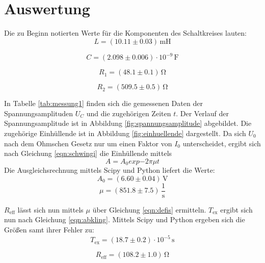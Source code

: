 \section{Auswertung}
\label{sec:Auswertung}
Die zu Beginn notierten Werte für die Komponenten des Schaltkreises lauten:
\begin{equation*}
	L=(10.11 \pm 0.03) \,\si{\milli\henry}
\end{equation*}

\begin{equation*}
	C=(2.098 \pm 0.006) \cdot 10^{-9} \, \si{\farad}
\end{equation*}

\begin{equation*}
	R_\text{1}= (48.1 \pm 0.1) \, \si{\ohm}
\end{equation*}

\begin{equation*}
	R_\text{2}= (509.5\pm 0.5)\,\si{\ohm}
\end{equation*}


In Tabelle \ref{tab:messung1} finden sich die gemessenen Daten der Spannungsamplituden $U_C$ und die zugehörigen Zeiten $t$.
Der Verlauf der Spannungsamplitude ist in Abbildung \ref{fig:spannungsamplitude} abgebildet. Die zugehörige Einhüllende ist in Abbildung \ref{fig:einhuellende} dargestellt.
Da sich $U_\text{0}$ nach dem Ohmschen Gesetz nur um einen Faktor von $I_\text{0}$ unterscheidet, ergibt sich nach Gleichung \eqref{eqn:schwingi} die Einhüllende mittels
\begin{equation}
	A=A_\text{0}exp{-2 \pi \mu t}
\end{equation}
Die Ausgleichsrechnung mittels Scipy und Python liefert die Werte:
\begin{equation*}
	A_0 =  (6.60 \pm 0.04) \,\si{\volt}
\end{equation*}
\begin{equation*}
	\mu =  (851.8 \pm 7.5) \, \frac{1}{\si{\second}}
\end{equation*}

$R_\text{eff}$ lässt sich nun mittels $\mu$ über Gleichung \eqref{eqn:defis} ermitteln. $T_\text{ex}$ ergibt sich nun nach Gleichung \eqref{eqn:abkling}.
Mittels Scipy und Python ergeben sich die Größen samt ihrer Fehler zu:
\begin{equation*}
  T_{\text{ex}}=(18.7 \pm 0.2) \cdot 10^{-5}\,\si{\second}
\end{equation*}

\begin{equation*}
  R_{\text{eff}}= (108.2 \pm 1.0) \,\si{\ohm}
\end{equation*}


